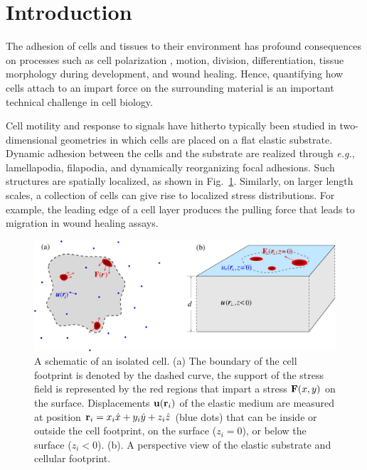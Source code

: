 \documentclass[aps,prl,reprint,twocolumn,groupedaddress,showpacs]{revtex4-1}
\def\r{{\bf r}}
\begin{document}
\section{Introduction}

The adhesion of cells and tissues to their environment has profound
consequences on processes such as cell polarization \cite{MASHA},
motion, division, differentiation, tissue morphology during
development, and wound healing. Hence, quantifying how cells attach to
an impart force on the surrounding material is an important technical
challenge in cell biology.

Cell motility and response to signals have hitherto typically been
studied in two-dimensional geometries in which cells are placed on a
flat elastic substrate.  Dynamic adhesion between the cells and the
substrate are realized through {\it e.g.}, lamellapodia, filapodia,
and dynamically reorganizing focal adhesions.  Such structures are
spatially localized, as shown in Fig.~\ref{FIG1}. Similarly, on larger
length scales, a collection of cells can give rise to localized stress
distributions. For example, the leading edge of a cell layer produces
the pulling force that leads to migration in wound healing assays.

\begin{figure}[t]
\begin{center}
\includegraphics[width=\linewidth]{Fig1}
\caption{A schematic of an isolated cell. (a) The boundary of the cell
  footprint is denoted by the dashed curve, the support of the stress field is
  represented by the red regions that impart a stress ${\bf F}(x,y)$
  on the surface. Displacements ${\bf u}(\r_{i})$ of the elastic
  medium are measured at position $\r_{i} =
  x_{i}\hat{x}+y_{i}\hat{y}+z_{i}\hat{z}$ (blue dots) that can be
  inside or outside the cell footprint, on the surface ($z_{i}=0$), or
  below the surface ($z_{i}<0$). (b). A perspective view of the
  elastic substrate and cellular footprint.}
\label{FIG1}
\end{center}
\end{figure}
\end{document}
